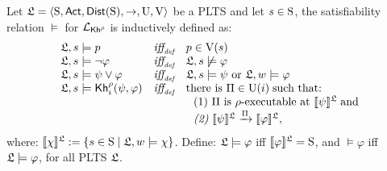 \begin{definition} \label{def:semantics}
    Let $\model = \tup{\S,\ACT,\dist(\S),\ra,\Unc,\V}$ be a PLTS and let $s\in\S$, the satisfiability relation $\models$ for $\PKh$ is inductively defined as:
    \[
    \begin{array}{l@{\ \ \ }c@{\ \ \  }l}
    \model, s \models p & \iffdef & p \in \V(s) \\
    \model, s\models \neg\varphi & \iffdef & \model, s \not\models \varphi \\
    \model, s \models \psi\vee\varphi & \iffdef & \model, s \models \psi \mbox{ or }\model, w \models \varphi \\
    \model, s \models \kh_i^\rho(\psi,\varphi) & \iffdef & \text{there is } \plans \in \Unc(i) \;\text{such that:} \\
    & & \ \ \text{\rm (1)} \ \plans \text{ is $\rho$-executable at }  \truthset{\model}{\psi}\; \text{and} \\
    & & \ \ \text{\em (2)} \ \truthset{\model}{\psi} \reach{\plans} \truthset{\model}{\varphi},
    \end{array}
    \]    
    where: $\truthset{\model}{\chi} := \csetsc{s\in\S}{\model,w\models\chi}$. Define: $\model\models\varphi$ iff  $\truthset{\model}{\varphi}=\S$, and $\models\varphi$ iff $\model\models\varphi$, for all PLTS $\model$.
\end{definition}